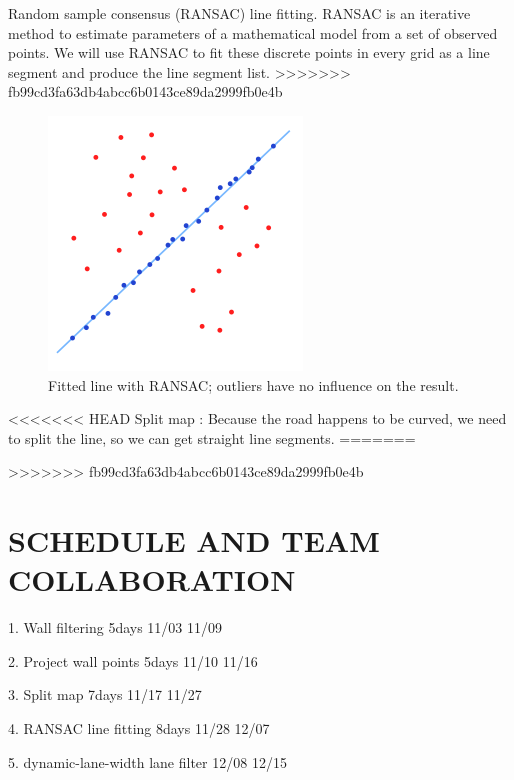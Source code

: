 \documentclass[letterpaper, 10 pt, conference]{ieeeconf}  %
\begin{document}
Random sample consensus (RANSAC) line fitting. RANSAC is an iterative method to estimate parameters of a mathematical model from a set of observed points. We will use RANSAC to fit these discrete points in every grid as a line segment and produce the line segment list.
>>>>>>> fb99cd3fa63db4abcc6b0143ce89da2999fb0e4b
\begin{figure}[h] %
\includegraphics[width=0.5\columnwidth]{RANSAC.png}
\centering
\caption{Fitted line with RANSAC; outliers have no influence on the result.}
\end{figure}

<<<<<<< HEAD
Split map : 
Because the road happens to be curved, we need to split the line, so we can get straight line segments.
=======

>>>>>>> fb99cd3fa63db4abcc6b0143ce89da2999fb0e4b


\section{SCHEDULE AND TEAM COLLABORATION}

1. Wall filtering	    5days	11/03	11/09

2. Project wall points	5days	11/10	11/16

3. Split map	        7days	11/17	11/27

4. RANSAC line fitting	8days	11/28	12/07

5. dynamic-lane-width lane filter 12/08 12/15

\addtolength{\textheight}{-12cm}   %



\end{document}
